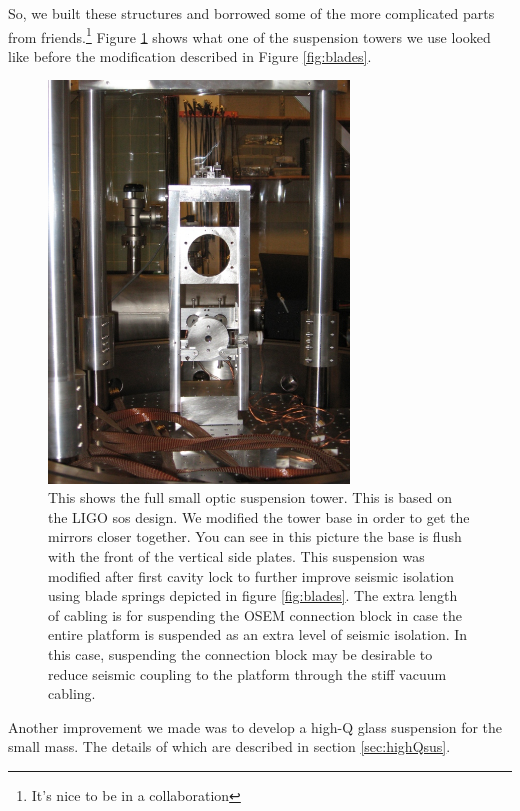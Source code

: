 So, we built these structures and borrowed some of the more complicated parts
from friends.\footnote{It's nice to be in a collaboration}
Figure \ref{fig:susbig} shows what one of the suspension towers we use looked
like before the modification described in
Figure \ref{fig:blades}.

\begin{figure}
\centering
  \includegraphics[width=8cm]{./figures/susbig.jpg}
  \caption[Small Optic Suspension]{This shows the full small optic suspension
  tower.
  This is based on the LIGO \ac{sos} design.
  We modified the tower base in order to get the mirrors closer together.
  You can see in this picture the base is flush with the front of the
  vertical side plates.
  This suspension was modified after first cavity lock to further improve
  seismic isolation using blade springs depicted in figure \ref{fig:blades}.
  The extra length of cabling is for suspending the OSEM connection block
  in case the entire platform is suspended as an extra level of seismic
  isolation.
  In this case, suspending the connection block may be desirable to reduce
  seismic coupling to the platform through the stiff vacuum cabling.
  }
  \label{fig:susbig}
\end{figure}

Another improvement we made was to develop a high-Q glass suspension for the
small mass. The details of which are described in section \ref{sec:highQsus}.

